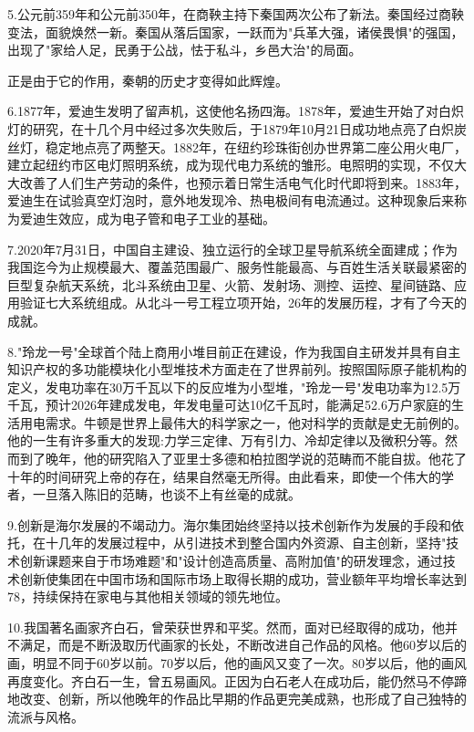 \documentclass[UTF8]{ctexart}
\begin{document}
5.公元前359年和公元前350年，在商鞅主持下秦国两次公布了新法。秦国经过商鞅变法，面貌焕然一新。秦国从落后国家，一跃而为"兵革大强，诸侯畏惧"的强国，出现了"家给人足，民勇于公战，怯于私斗，乡邑大治"的局面。\par
正是由于它的作用，秦朝的历史才变得如此辉煌。\par
6.1877年，爱迪生发明了留声机，这使他名扬四海。1878年，爱迪生开始了对白炽灯的研究，在十几个月中经过多次失败后，于1879年10月21日成功地点亮了白炽炭丝灯，稳定地点亮了两整天。1882年，在纽约珍珠街创办世界第二座公用火电厂，建立起纽约市区电灯照明系统，成为现代电力系统的雏形。电照明的实现，不仅大大改善了人们生产劳动的条件，也预示着日常生活电气化时代即将到来。1883年，爱迪生在试验真空灯泡时，意外地发现冷、热电极间有电流通过。这种现象后来称为爱迪生效应，成为电子管和电子工业的基础。\par
7.2020年7月31日，中国自主建设、独立运行的全球卫星导航系统全面建成；作为我国迄今为止规模最大、覆盖范围最广、服务性能最高、与百姓生活关联最紧密的巨型复杂航天系统，北斗系统由卫星、火箭、发射场、测控、运控、星间链路、应用验证七大系统组成。从北斗一号工程立项开始，26年的发展历程，才有了今天的成就。\par
8."玲龙一号"全球首个陆上商用小堆目前正在建设，作为我国自主研发并具有自主知识产权的多功能模块化小型堆技术方面走在了世界前列。按照国际原子能机构的定义，发电功率在30万千瓦以下的反应堆为小型堆，"玲龙一号"发电功率为12.5万千瓦，预计2026年建成发电，年发电量可达10亿千瓦时，能满足52.6万户家庭的生活用电需求。牛顿是世界上最伟大的科学家之一，他对科学的贡献是史无前例的。他的一生有许多重大的发现:力学三定律、万有引力、冷却定律以及微积分等。然而到了晚年，他的研究陷入了亚里士多德和柏拉图学说的范畴而不能自拔。他花了十年的时间研究上帝的存在，结果自然毫无所得。由此看来，即使一个伟大的学者，一旦落入陈旧的范畴，也谈不上有丝毫的成就。\par
9.创新是海尔发展的不竭动力。海尔集团始终坚持以技术创新作为发展的手段和依托，在十几年的发展过程中，从引进技术到整合国内外资源、自主创新，坚持"技术创新课题来自于市场难题"和"设计创造高质量、高附加值"的研发理念，通过技术创新使集团在中国市场和国际市场上取得长期的成功，营业额年平均增长率达到78，持续保持在家电与其他相关领域的领先地位。\par
10.我国著名画家齐白石，曾荣获世界和平奖。然而，面对已经取得的成功，他并不满足，而是不断汲取历代画家的长处，不断改进自己作品的风格。他60岁以后的画，明显不同于60岁以前。70岁以后，他的画风又变了一次。80岁以后，他的画风再度变化。齐白石一生，曾五易画风。正因为白石老人在成功后，能仍然马不停蹄地改变、创新，所以他晚年的作品比早期的作品更完美成熟，也形成了自己独特的流派与风格。\par
\newpage
\end{document}
